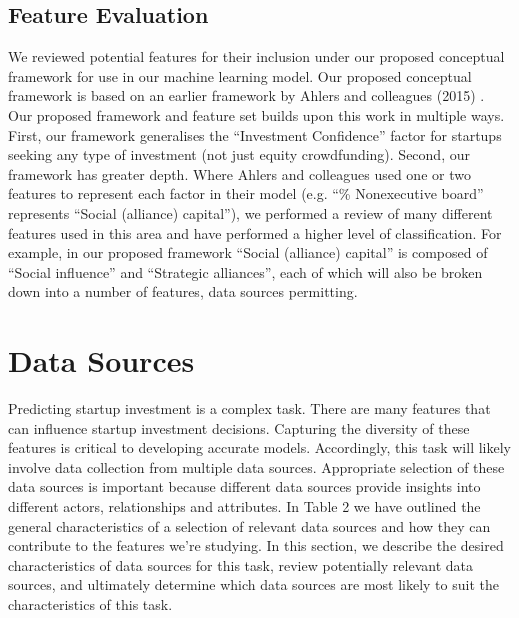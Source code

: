 \documentclass[../thesis/thesis.tex]{subfiles}
\begin{document}

\label{fig:litreview:features:summary}

\subsection{Feature Evaluation}

We reviewed potential features for their inclusion under our proposed conceptual framework for use in our machine learning model. Our proposed conceptual framework is based on an earlier framework by Ahlers and colleagues (2015) \cite{ahlers2015}. Our proposed framework and feature set builds upon this work in multiple ways. First, our framework generalises the ``Investment Confidence'' factor for startups seeking any type of investment (not just equity crowdfunding). Second, our framework has greater depth. Where Ahlers and colleagues used one or two features to represent each factor in their model (e.g. ``\% Nonexecutive board'' represents ``Social (alliance) capital''), we performed a review of many different features used in this area and have performed a higher level of classification. For example, in our proposed framework ``Social (alliance) capital'' is composed of ``Social influence'' and ``Strategic alliances'', each of which will also be broken down into a number of features, data sources permitting.

\section{Data Sources}
\label{sec:litreview:sources}

Predicting startup investment is a complex task. There are many features that can influence startup investment decisions. Capturing the diversity of these features is critical to developing accurate models. Accordingly, this task will likely involve data collection from multiple data sources. Appropriate selection of these data sources is important because different data sources provide insights into different actors, relationships and attributes. In Table 2 we have outlined the general characteristics of a selection of relevant data sources and how they can contribute to the features we're studying. In this section, we describe the desired characteristics of data sources for this task, review potentially relevant data sources, and ultimately determine which data sources are most likely to suit the characteristics of this task.


\label{fig:litreview:sources:summary}
\end{document}
